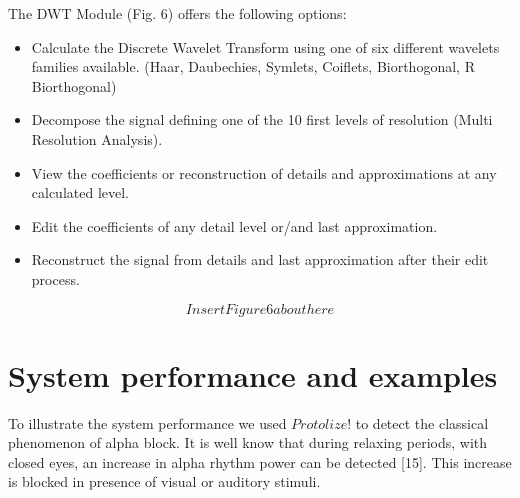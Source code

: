 \documentclass[12pt, a4paper]{article}
\begin{document}
The DWT Module (Fig. 6) offers the following options:
\begin{itemize}
\item Calculate the Discrete Wavelet Transform using one of six different wavelets families available. (Haar, Daubechies, Symlets, Coiflets, Biorthogonal, R Biorthogonal)
\item Decompose the signal defining one of the 10 first levels of resolution (Multi Resolution Analysis). 
\item View the coefficients or reconstruction of details and approximations at any calculated level. 
\item Edit the coefficients of any detail level or/and last approximation. 
\item Reconstruct the signal from details and last approximation after their edit process.
\end{itemize}
$$Insert Figure 6 about here$$


\section{System performance and examples}

To illustrate the system performance we used $Protolize!$ to detect the classical phenomenon of alpha block.  It is well know that during relaxing periods, with closed eyes, an increase in alpha rhythm power can be detected [15]. This increase is blocked in presence of visual or auditory stimuli. 
\end{document}
